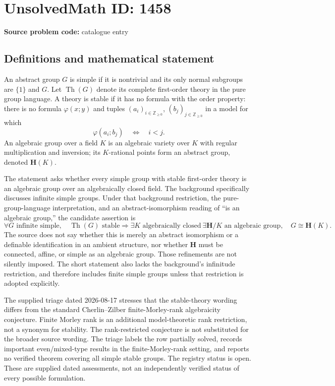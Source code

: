 \documentclass[11pt]{article}
\newcommand{\Z}{\mathbb{Z}}
\begin{document}
\section*{UnsolvedMath ID: 1458}
\textbf{Source problem code:} catalogue entry
\subsection{Definitions and mathematical statement}
An abstract group \(G\) is simple if it is nontrivial and its only normal subgroups are \(\{1\}\) and \(G\). Let \(\operatorname{Th}(G)\) denote its complete first-order theory in the pure group language. A theory is stable if it has no formula with the order property: there is no formula \(\varphi(x;y)\) and tuples \((a_i)_{i\in\Z_{\geq0}}\), \((b_j)_{j\in\Z_{\geq0}}\) in a model for which
\[
\varphi(a_i;b_j)\quad\Longleftrightarrow\quad i<j.
\]
An algebraic group over a field \(K\) is an algebraic variety over \(K\) with regular multiplication and inversion; its \(K\)-rational points form an abstract group, denoted \(\mathbf H(K)\).

The statement asks whether every simple group with stable first-order theory is an algebraic group over an algebraically closed field. The background specifically discusses infinite simple groups. Under that background restriction, the pure-group-language interpretation, and an abstract-isomorphism reading of ``is an algebraic group,'' the candidate assertion is
\[
\forall G\text{ infinite simple},\quad
\operatorname{Th}(G)\text{ stable}
\Longrightarrow
\exists K\text{ algebraically closed}\ \exists\mathbf H/K\text{ an algebraic group},\quad
G\cong\mathbf H(K).
\]
The source does not say whether this is merely an abstract isomorphism or a definable identification in an ambient structure, nor whether \(\mathbf H\) must be connected, affine, or simple as an algebraic group. Those refinements are not silently imposed. The short statement also lacks the background's infinitude restriction, and therefore includes finite simple groups unless that restriction is adopted explicitly.

The supplied triage dated 2026-08-17 stresses that the stable-theory wording differs from the standard Cherlin--Zilber finite-Morley-rank algebraicity conjecture. Finite Morley rank is an additional model-theoretic rank restriction, not a synonym for stability. The rank-restricted conjecture is not substituted for the broader source wording. The triage labels the row partially solved, records important even/mixed-type results in the finite-Morley-rank setting, and reports no verified theorem covering all simple stable groups. The registry status is open. These are supplied dated assessments, not an independently verified status of every possible formulation.
\end{document}
